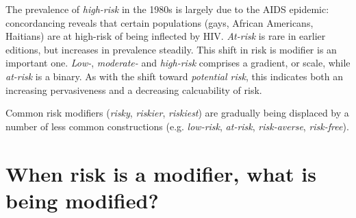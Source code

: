     The prevalence of \emph{high-risk} in the 1980s is largely due to the AIDS epidemic: concordancing reveals that certain populations (gays, African Americans, Haitians) are at high-risk of being inflected by HIV. \emph{At-risk} is rare in earlier editions, but increases in prevalence steadily. This shift in risk is modifier is an important one. \emph{Low-}, \emph{moderate-} and \emph{high-risk} comprises a gradient, or scale, while \emph{at-risk} is a binary. As with the shift toward \emph{potential risk}, this indicates both an increasing pervasiveness and a decreasing calcuability of risk. %
    




    \vspace{5mm}\noindent\begin{tcolorbox}[colback=yellow!5,colframe=yellow!40!black,title=Summary: frequencies of modifier risk]
    \parbox{1\textwidth}{%
    Common risk modifiers (\emph{risky}, \emph{riskier}, \emph{riskiest}) are gradually being displaced by a number of less common constructions (e.g. \emph{low-risk}, \emph{at-risk}, \emph{risk-averse}, \emph{risk-free}).}
    \end{tcolorbox}
    \vspace{5mm}

\section{When risk is a modifier, what is being modified?} \label{sect:mod_two} \FloatBarrier 

